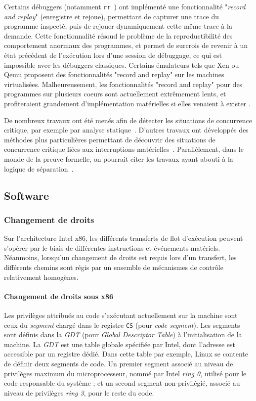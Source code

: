 Certains débuggers (notamment \texttt{rr}~\cite{mozRR}) ont implémenté une fonctionnalité "\emph{record and replay}" (enregistre et rejoue), permettant de capturer une trace du programme inspecté, puis de rejouer dynamiquement cette même trace à la demande. Cette fonctionnalité résoud le problème de la reproductibilité des comportement anormaux des programmes, et permet de surcrois de revenir à un état précédent de l'exécution lors d'une session de débuggage, ce qui est impossible avec les débuggers classiques. Certains émulateurs tels que Xen ou Qemu proposent des fonctionnalités "record and replay" sur les machines virtualisées. Malheureusement, les fonctionnalités "record and replay" pour des programmes sur plusieurs coeurs sont actuellement extrêmement lents, et profiteraient grandement d'implémentation matérielles si elles venaient à exister \cite{mozRR}.

De nombreux travaux ont été menés afin de détecter les situations de concurrence critique, par exemple par analyse statique~\cite{racerX}. D'autres travaux ont développés des méthodes plus particulières permettant de découvrir des situations de concurrence critique liées aux interruptions matérielles~\cite{sdracer}. Parallèlement, dans le monde de la preuve formelle, on pourrait citer les travaux ayant abouti à la logique de séparation~\cite{separationlogic}.

		\subsection{Software}

			\subsubsection{Changement de droits}

Sur l'architecture Intel x86, les différents transferts de flot d'exécution peuvent s'opérer par le biais de différentes instructions et événements matériels. Néanmoins, lorsqu'un changement de droits est requis lors d'un transfert, les différents chemins sont régis par un ensemble de mécanismes de contrôle relativement homogènes.

\paragraph{Changement de droits sous x86}
\label{ring}

Les privilèges attribués au code s'exécutant actuellement sur la machine sont ceux du \emph{segment} chargé dans le registre \texttt{CS} (pour \emph{code segment}). Les segments sont définis dans la \emph{GDT} (pour \emph{Global Descriptor Table}) à l'initialisation de la machine. La \emph{GDT} est une table globale spécifiée par Intel, dont l'adresse est accessible par un registre dédié. Dans cette table par exemple, Linux se contente de définir deux segments de code. Un premier segment associé au niveau de privilèges maximum du microprocesseur, nommé par Intel \emph{ring 0}, utilisé pour le code responsable du système ; et un second segment non-privilégié, associé au niveau de privilèges \emph{ring 3}, pour le reste du code. 

